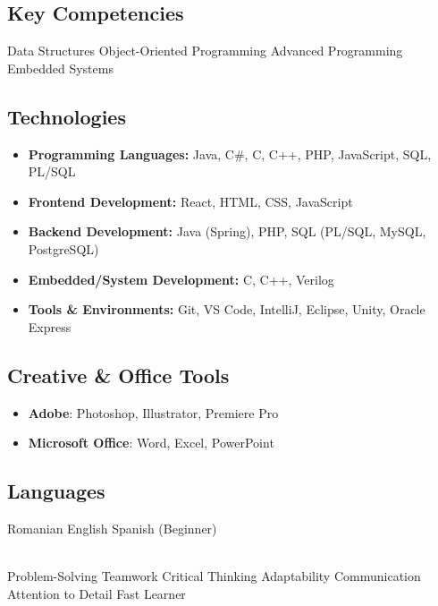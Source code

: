 \documentclass[a4paper]{MagicalCV}
\begin{document}
\hfill
\begin{minipage}[t]{0.59\textwidth} 


\subsection{Key Competencies}
Data Structures \textbullet{} Object-Oriented Programming \textbullet{} Advanced Programming \textbullet{} Embedded Systems
\sectionsep

\subsection{Technologies}
\begin{itemize}
    \item \textbf{Programming Languages:} Java, C\#, C, C++, PHP, JavaScript, SQL, PL/SQL
    \item \textbf{Frontend Development:} React, HTML, CSS, JavaScript
    \item \textbf{Backend Development:} Java (Spring), PHP, SQL (PL/SQL, MySQL, PostgreSQL)
    \item \textbf{Embedded/System Development:} C, C++, Verilog
    \item \textbf{Tools \& Environments:} Git, VS Code, IntelliJ, Eclipse, Unity, Oracle Express
\end{itemize}
\sectionsep

\subsection{Creative \& Office Tools}
\begin{itemize}
    \item \textbf{Adobe}: Photoshop, Illustrator, Premiere Pro
    \item \textbf{Microsoft Office}: Word, Excel, PowerPoint
\end{itemize}
\sectionsep

\subsection{Languages}
Romanian \textbullet{} English \textbullet{} Spanish (Beginner)
\sectionsep

 \\
Problem-Solving \textbullet{} Teamwork \textbullet{} Critical Thinking \textbullet{} Adaptability \textbullet{} Communication \textbullet{} Attention to Detail \textbullet{} Fast Learner
\sectionsep


\end{minipage}
\end{document}
